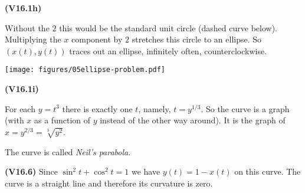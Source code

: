 \documentclass[openany,reqno]{amsbook}
\begin{document}
\begin{trivlist}
\item[{\bf(V16.1h)}]

  Without the $2$ this would be the standard unit circle (dashed curve below).
  Multiplying the $x$ component by $2$ stretches this circle to an ellipse.  So
  $(x(t), y(t))$ traces out an ellipse, infinitely often, counterclockwise.

  \begin{center}
    \texttt{[image: figures/05ellipse-problem.pdf]}
  \end{center}

  \bigskip

\item[{\bf(V16.1i)}]

  For each $y=t^3$ there is exactly one $t$, namely, $t=y^{1/3}$.  So the curve is
  a graph (with $x$ as a function of $y$ instead of the other way around).  It
  is the graph of $x=y^{2/3} = \sqrt[3]{y^2}$.
  \begin{center}
    
  \end{center}
  The curve is called \emph{Neil's parabola}.
  \bigskip

\item[{\bf(V16.6)}] Since $\sin^2t + \cos^2 t =1$ we have $y(t) = 1-x(t)$ on this curve.  The curve
  is a straight line and therefore its curvature is zero.
  \bigskip

\end{trivlist}
\noproblemfont
\end{document}
